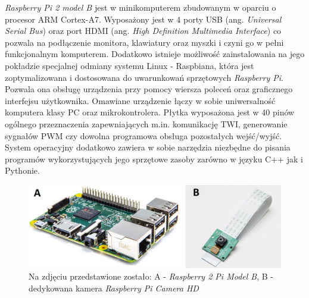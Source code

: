 \textit{Raspberry Pi 2 model B} jest w minikomputerem zbudowanym w oparciu o procesor ARM Cortex-A7. Wyposażony jest w 4 porty USB (ang. \textit{Universal Serial Bus}) oraz port HDMI (ang. \textit{High Definition Multimedia Interface}) co pozwala na podłączenie monitora, klawiatury oraz myszki i czyni go w pełni funkcjonalnym komputerem. Dodatkowo istnieje możliwość zainstalowania na jego pokładzie specjalnej odmiany systemu Linux - Raspbiana, która jest zoptymalizowana i dostosowana do uwarunkowań sprzętowych \textit{Raspberry Pi}. Pozwala ona obsługę urządzenia przy pomocy wiersza poleceń oraz graficznego interfejsu użytkownika. Omawiane urządzenie łączy w sobie uniwersalność komputera klasy PC oraz mikrokontrolera. Płytka wyposażona jest w 40 pinów ogólnego przeznaczenia zapewniających m.in. komunikację TWI, generowanie sygnałów PWM czy dowolna programowa obsługa pozostałych wejść/wyjść. System operacyjny dodatkowo zawiera w sobie narzędzia niezbędne do pisania programów wykorzystujących jego sprzętowe zasoby zarówno w języku C++ jak i Pythonie. 

\begin{figure}[H]
    \begin{center}
      \includegraphics[scale=0.3]{imgs/raspberry_pi.png}
 	\caption[Raspberry Pi wraz z kamerą.]{\small{Na zdjęciu przedstawione zostało: A - \textit{Raspberry 2 Pi Model B}}\footnotemark \small{, B - dedykowana kamera \textit{Raspberry Pi Camera HD}}\footnotemark }
	\label{trans_TWI}
    \end{center}
  \end{figure}  

